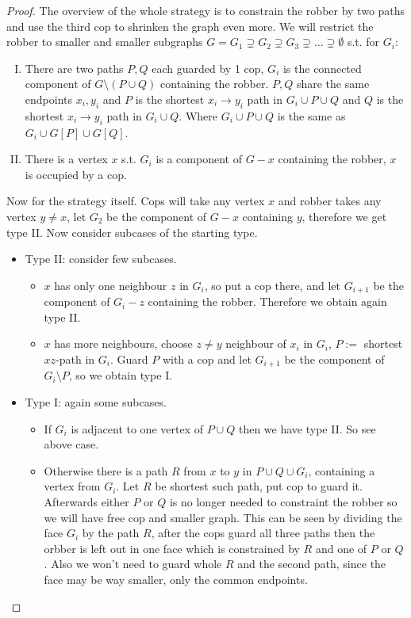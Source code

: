 \begin{proof}
	The overview of the whole strategy is to constrain the robber by two paths and use the third cop to shrinken the graph even more. We will restrict the robber to smaller and smaller subgraphs $G = G_1 \supsetneq G_2 \supsetneq G_3 \supsetneq \dots \supsetneq \emptyset$ s.t. for $G_i$:
	
	\begin{enumerate}[I)]
		\item There are two paths $P,Q$ each guarded by 1 cop, $G_i$ is the connected component of $G \setminus (P \cup Q)$ containing the robber. $P,Q$ share the same endpoints $x_i, y_i$ and $P$ is the shortest $x_i \to y_i$ path in $G_i \cup P \cup Q$ and $Q$ is the shortest $x_i \to y_i$ path in $G_i \cup Q$. Where $G_i \cup P \cup Q$ is the same as $G_i \cup G[P] \cup G[Q]$.
		\item There is a vertex $x$ s.t. $G_i$ is a component of $G-x$ containing the robber, $x$ is occupied by a cop.
	\end{enumerate}
	
	Now for the strategy itself. Cops will take any vertex $x$ and robber takes any vertex $y \neq x$, let $G_2$ be the component of $G - x$ containing $y$, therefore we get type II. Now consider subcases of the starting type.
	
	\begin{itemize}[]
		\item Type II: consider few subcases.
		
		\begin{itemize}
			\item $x$ has only one neighbour $z$ in $G_i$, so put a cop there, and let $G_{i+1}$ be the component of $G_i - z$ containing the robber. Therefore we obtain again type II.
			\item $x$ has more neighbours, choose $z \neq y$ neighbour of $x_i$ in $G_i$, $P :=$ shortest $xz$-path in $G_i$. Guard $P$ with a cop and let $G_{i+1}$ be the component of $G_i \setminus P$, so we obtain type I.
		\end{itemize}
		
		\item Type I: again some subcases.
		
		\begin{itemize}
			\item If $G_i$ is adjacent to one vertex of $P \cup Q$ then we have type II. So see above case.
			\item Otherwise there is a path $R$ from $x$ to $y$ in $P \cup Q \cup G_i$, containing a vertex from $G_i$. Let $R$ be shortest such path, put cop to guard it. Afterwards either $P$ or $Q$ is no longer needed to constraint the robber so we will have free cop and smaller graph. This can be seen by dividing the face $G_i$ by the path $R$, after the cops guard all three paths then the orbber is left out in one face which is constrained by $R$ and one of $P$ or $Q$. Also we won't need to guard whole $R$ and the second path, since the face may be way smaller, only the common endpoints.
		\end{itemize}
	\end{itemize}
\end{proof}